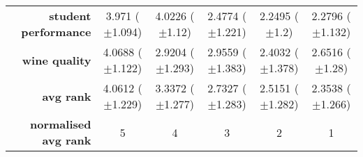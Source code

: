 \begin{table}[htbp]
{\begin{tabular}{r|ccccc}
			\textbf{student performance} & \cellcolor[rgb]{ .976,  .431,  .424}3.971 ($\pm$1.094)  & \cellcolor[rgb]{ .973,  .412,  .42}4.0226 ($\pm$1.12)   & \cellcolor[rgb]{ 1,  .922,  .518}2.4774 ($\pm$1.221)    & \cellcolor[rgb]{ .388,  .745,  .482}2.2495 ($\pm$1.2)   & \cellcolor[rgb]{ .467,  .765,  .486}2.2796 ($\pm$1.132) \\
			\textbf{wine quality}        & \cellcolor[rgb]{ .973,  .412,  .42}4.0688 ($\pm$1.122)  & \cellcolor[rgb]{ 1,  .922,  .518}2.9204 ($\pm$1.293)    & \cellcolor[rgb]{ 1,  .906,  .518}2.9559 ($\pm$1.383)    & \cellcolor[rgb]{ .388,  .745,  .482}2.4032 ($\pm$1.378) & \cellcolor[rgb]{ .678,  .827,  .498}2.6516 ($\pm$1.28)  \\
			\midrule
			\textbf{avg rank}            & \cellcolor[rgb]{ .973,  .412,  .42}4.0612 ($\pm$1.229)  & \cellcolor[rgb]{ .988,  .69,  .475}3.3372 ($\pm$1.277)  & \cellcolor[rgb]{ 1,  .922,  .518}2.7327 ($\pm$1.283)    & \cellcolor[rgb]{ .647,  .82,  .494}2.5151 ($\pm$1.282)  & \cellcolor[rgb]{ .388,  .745,  .482}2.3538 ($\pm$1.266) \\
			\midrule
			\textbf{normalised avg rank} & \cellcolor[rgb]{ .973,  .412,  .42}5                    & \cellcolor[rgb]{ .988,  .667,  .471}4                   & \cellcolor[rgb]{ 1,  .922,  .518}3                      & \cellcolor[rgb]{ .694,  .831,  .498}2                   & \cellcolor[rgb]{ .388,  .745,  .482}1                   \\
		\end{tabular}%

	}
\end{table}%

